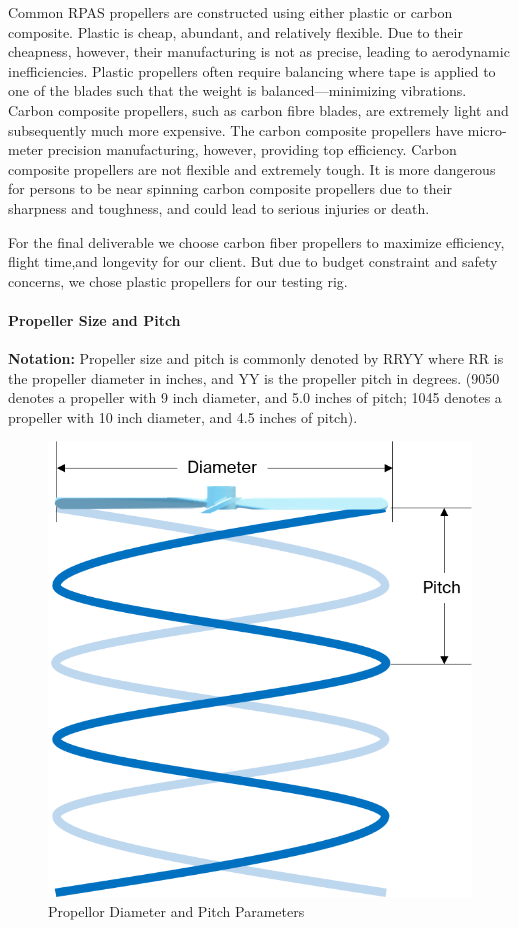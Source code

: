 Common RPAS propellers are constructed using either plastic or carbon composite. Plastic is cheap, abundant, 
and relatively flexible. Due to their cheapness, however, their manufacturing is not as precise, leading to 
aerodynamic inefficiencies. Plastic propellers often require balancing where tape is applied to one of the 
blades such that the weight is balanced---minimizing vibrations. Carbon composite propellers, such as 
carbon fibre blades, are extremely light and subsequently much more expensive. The carbon composite 
propellers have micro-meter precision manufacturing, however, providing top efficiency. Carbon composite 
propellers are not flexible and extremely tough. It is more dangerous for persons to be near spinning 
carbon composite propellers due to their sharpness and toughness, and could lead to serious injuries or death.

For the final deliverable we choose carbon fiber propellers to maximize efficiency, flight time,and longevity for our client. But due to budget constraint and safety concerns, we chose plastic propellers for our testing rig.

\paragraph{Propeller Size and Pitch}

\textbf{Notation: } Propeller size and pitch is commonly denoted by RRYY where RR is the propeller diameter in inches, and YY is the propeller pitch in degrees. (9050 denotes a propeller with 9 inch diameter, and 5.0 inches of pitch; 1045 denotes a propeller with 10 inch diameter, and 4.5 inches of pitch).

\begin{figure}[H]
    \centering
    \includegraphics[scale=0.5]{img/proppitch}
    \caption{Propellor Diameter and Pitch Parameters}
    \label{fig:propeller}
\end{figure}

